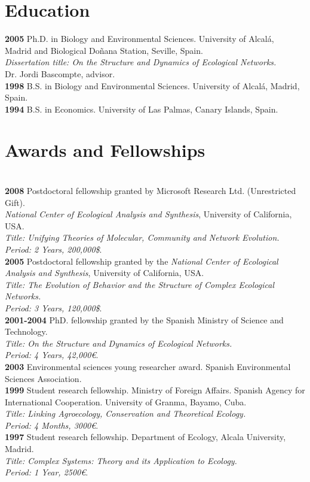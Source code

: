 \documentclass[12pt]{article}
\begin{document}
\begin{flushleft}
\section{ Education}
{\bf 2005} Ph.D. in Biology and Environmental Sciences. University of Alcal\'a,\\ Madrid and Biological Do\~nana Station,
Seville, Spain.\\ {\em Dissertation title: On the Structure and Dynamics of Ecological Networks.}\\
Dr. Jordi Bascompte, advisor.\\
{\bf 1998} B.S. in Biology and Environmental Sciences. University of Alcal\'a, Madrid, Spain.\\
{\bf 1994} B.S. in Economics. University of Las Palmas, Canary Islands, Spain.
\section{Awards and Fellowships}
\\
{\bf 2008} Postdoctoral fellowship granted by Microsoft Research Ltd. (Unrestricted Gift).\\
 {\em National Center of Ecological Analysis and Synthesis}, University of California, USA.\\
{\em Title: Unifying Theories of Molecular, Community and Network Evolution.}\\
{\em Period: 2 Years, 200,000\$}.\\
{\bf 2005} Postdoctoral fellowship granted by the {\em National Center of Ecological Analysis and Synthesis}, University of California, USA.\\
{\em Title: The Evolution of Behavior and the Structure of Complex Ecological Networks.}\\
{\em Period: 3 Years, 120,000\$}.\\

{\bf 2001-2004} PhD. fellowship granted by the Spanish Ministry of Science and Technology.\\
{\em Title: On the Structure and Dynamics of Ecological Networks.}\\
{\em Period: 4 Years, 42,000\euro}.\\
{\bf 2003} Environmental sciences young researcher award. Spanish Environmental Sciences Association.\\
{\bf 1999} Student research fellowship. Ministry of Foreign Affairs. Spanish Agency for International Cooperation. University of Granma, Bayamo, Cuba.\\
{\em Title: Linking Agroecology, Conservation and Theoretical Ecology.}\\
{\em Period: 4 Months, 3000\euro}.\\
{\bf 1997} Student research fellowship. Department of Ecology, Alcala University, Madrid.\\
{\em Title: Complex Systems: Theory and its Application to Ecology.}\\
{\em Period: 1 Year, 2500\euro}.\\

\end{flushleft}
\end{document}
